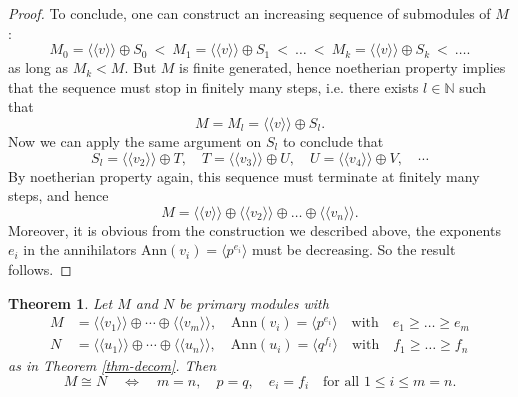 \documentclass[12pt]{amsbook}
\newtheorem{theorem}{Theorem}[section]
\begin{document}
\begin{proof}
    \bigskip
    To conclude, one can construct an increasing sequence of submodules of $M$:
    $$M_0 = \langle \langle v \rangle \rangle \oplus S_0\ <\ M_1 = \langle \langle v \rangle \rangle \oplus S_1\ <\ \dots\ <\ M_k = \langle \langle v \rangle \rangle \oplus S_k\ <\ \dots.$$
    as long as $M_k < M$. But $M$ is finite generated, hence noetherian property implies that the sequence must stop in finitely many steps, i.e. there exists $l \in \mathbb{N}$ such that
    $$M = M_l = \langle \langle v \rangle \rangle \oplus S_l.$$
    Now we can apply the same argument on $S_l$ to conclude that
    $$S_l = \langle \langle v_2 \rangle \rangle \oplus T, \quad T = \langle \langle v_3 \rangle \rangle \oplus U, \quad U = \langle \langle v_4 \rangle \rangle \oplus V, \quad \cdots$$
    By noetherian property again, this sequence must terminate at finitely many steps, and hence
    $$M = \langle \langle v \rangle \rangle \oplus \langle \langle v_2 \rangle \rangle \oplus \dots \oplus \langle \langle v_n \rangle \rangle.$$
    Moreover, it is obvious from the construction we described above, the exponents $e_i$ in the annihilators $\mathrm{Ann}(v_i) = \langle p^{e_i}\rangle$ must be decreasing. So the result follows.
\end{proof}

\begin{theorem}
    Let $M$ and $N$ be primary modules with
    \begin{align*}
        M&=\langle\langle v_1\rangle\rangle\oplus\cdots\oplus\langle\langle v_m\rangle\rangle,\quad\mathrm{Ann}(v_i)= \langle p^{e_i} \rangle \quad \text{with} \quad e_1 \geq \dots \geq e_m\\
        N&=\langle\langle u_1\rangle\rangle\oplus\cdots\oplus\langle\langle u_n\rangle\rangle,\quad\mathrm{Ann}(u_i)=\langle q^{f_i} \rangle \quad \text{with} \quad f_1 \geq \dots \geq f_n
    \end{align*}
    as in Theorem \ref{thm-decom}. Then
    $$M\cong N\quad\Leftrightarrow\quad m=n,\quad p=q,\quad e_i=f_i\quad\text{for all }1\leq i\leq m=n.$$
\end{theorem}
\end{document}
